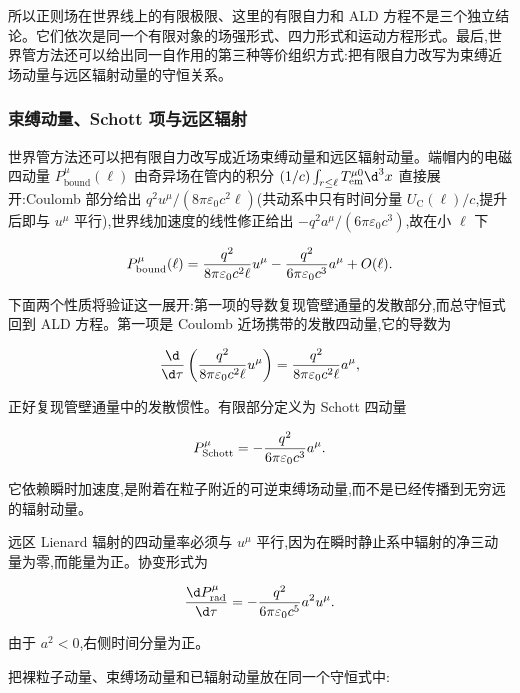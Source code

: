 所以正则场在世界线上的有限极限、这里的有限自力和 ALD 方程不是三个独立结论。它们依次是同一个有限对象的场强形式、四力形式和运动方程形式。最后,世界管方法还可以给出同一自作用的第三种等价组织方式:把有限自力改写为束缚近场动量与远区辐射动量的守恒关系。

\subsubsection{束缚动量、Schott 项与远区辐射}

世界管方法还可以把有限自力改写成近场束缚动量和远区辐射动量。端帽内的电磁四动量 $P_{\mathrm{bound}}^\mu(\ell)$ 由奇异场在管内的积分 $(1/c)\int_{r\le\ell}T_{\mathrm{em}}^{\mu0}\d^3x$ 直接展开:Coulomb 部分给出 $q^2u^\mu/(8\pi\varepsilon_0c^2\ell)$(共动系中只有时间分量 $U_{\mathrm C}(\ell)/c$,提升后即与 $u^\mu$ 平行),世界线加速度的线性修正给出 $-q^2a^\mu/(6\pi\varepsilon_0c^3)$,故在小 $\ell$ 下

\begin{equation*}
 P_{\mathrm{bound}}^\mu(\ell)
 ={q^2\over8\pi\varepsilon_0c^2\ell}u^\mu
 -{q^2\over6\pi\varepsilon_0c^3}a^\mu
 +O(\ell).
\end{equation*}

下面两个性质将验证这一展开:第一项的导数复现管壁通量的发散部分,而总守恒式回到 ALD 方程。第一项是 Coulomb 近场携带的发散四动量,它的导数为

\begin{equation*}
 {\d\over\d\tau}
 \left({q^2\over8\pi\varepsilon_0c^2\ell}u^\mu\right)
 ={q^2\over8\pi\varepsilon_0c^2\ell}a^\mu,
\end{equation*}

正好复现管壁通量中的发散惯性。有限部分定义为 Schott 四动量

\begin{equation*}
 P_{\mathrm{Schott}}^\mu
 =-{q^2\over6\pi\varepsilon_0c^3}a^\mu.
\end{equation*}

它依赖瞬时加速度,是附着在粒子附近的可逆束缚场动量,而不是已经传播到无穷远的辐射动量。

远区 Lienard 辐射的四动量率必须与 $u^\mu$ 平行,因为在瞬时静止系中辐射的净三动量为零,而能量为正。协变形式为

\begin{equation*}
 {\d P_{\mathrm{rad}}^\mu\over\d\tau}
 =-{q^2\over6\pi\varepsilon_0c^5}a^2u^\mu.
\end{equation*}

由于 $a^2<0$,右侧时间分量为正。

把裸粒子动量、束缚场动量和已辐射动量放在同一个守恒式中:

